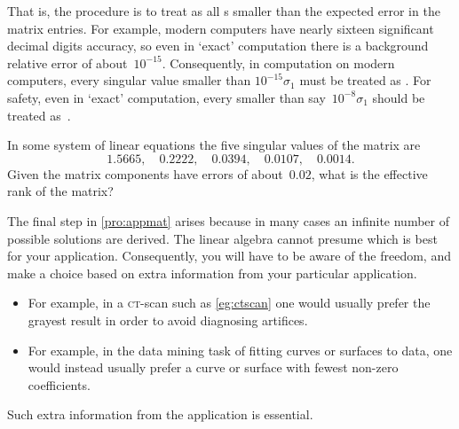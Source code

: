 That is, the procedure is to treat as  all s smaller than the expected error in the matrix entries.
For example, modern computers have nearly sixteen significant decimal digits accuracy, so even in `exact' computation there is a background relative error of about~\(10^{-15}\).
Consequently, in computation on modern computers, every singular value smaller than \(10^{-15}\sigma_1\) must be treated as .
For safety, even in `exact' computation, every  smaller than say~\(10^{-8}\sigma_1\) should be treated as~.


\begin{activity}
In some system of linear equations the five singular values of the matrix are
\begin{equation*}
1.5665,\quad
0.2222,\quad
0.0394,\quad
0.0107,\quad
0.0014.
\end{equation*}
Given the matrix components have errors of about~\(0.02\), what is the effective rank of the matrix?
\end{activity}

The final step in \autoref{pro:appmat} arises because in many cases an infinite number of possible solutions are derived.
The linear algebra cannot presume which is best for your application.
Consequently, you will have to be aware of the freedom, and make a choice based on extra information from your particular application.
\begin{itemize}
\item For example, in a \textsc{ct}-scan such as \autoref{eg:ctscan} one would usually prefer the grayest result in order to avoid diagnosing artifices.
\item For example, in the data mining task of fitting curves or surfaces to data, one would instead usually prefer a curve or surface with fewest non-zero coefficients.
\end{itemize}
Such extra information from the application is essential. 






